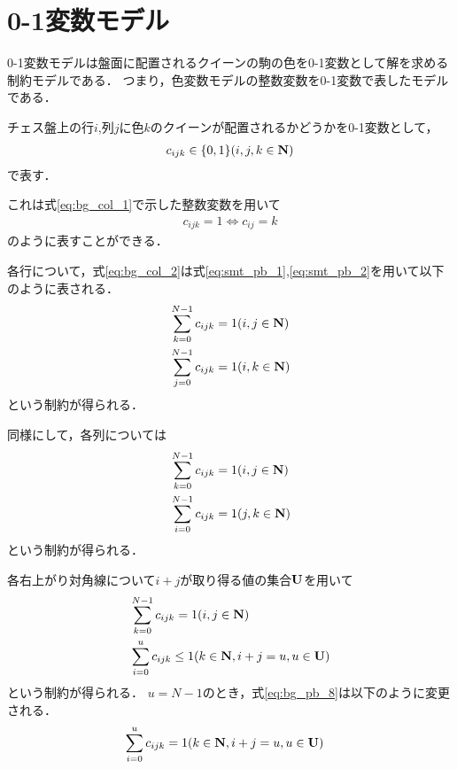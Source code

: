\section{0-1変数モデル}\label{sec:bg_pb}
0-1変数モデルは盤面に配置されるクイーンの駒の色を0-1変数として解を求める制約モデルである．
つまり，色変数モデルの整数変数を0-1変数で表したモデルである．

チェス盤上の行$i$,列$j$に色$k$のクイーンが配置されるかどうかを0-1変数として，
\begin{eqnarray}
    c_{ijk} \in \{0,1\} (i,j,k \in {\bf N}) \label{eq:bg_pb_1}
\end{eqnarray}
で表す．

これは式\ref{eq:bg_col_1}で示した整数変数を用いて
\begin{eqnarray}
    c_{ijk}=1 \Leftrightarrow c_{ij}=k \label{eq:bg_pb_2}
 \end{eqnarray}
のように表すことができる．

各行について，式\ref{eq:bg_col_2}は式\ref{eq:smt_pb_1},\ref{eq:smt_pb_2}を用いて以下のように表される．
\begin{eqnarray}
    & \sum_{k=0}^{N-1} c_{ijk} = 1     (i,j \in {\bf N}) \label{eq:bg_pb_3}\\
    & \sum_{j=0}^{N-1} c_{ijk} = 1     (i,k \in {\bf N}) \label{eq:bg_pb_4}
\end{eqnarray}
という制約が得られる．

同様にして，各列については
\begin{eqnarray}
    & \sum_{k=0}^{N-1} c_{ijk} = 1     (i,j \in {\bf N}) \label{eq:bg_pb_5}\\
    & \sum_{i=0}^{N-1} c_{ijk} = 1     (j,k \in {\bf N}) \label{eq:bg_pb_6}
\end{eqnarray}
という制約が得られる．

各右上がり対角線について$i+j$が取り得る値の集合$\bf U$を用いて
\begin{eqnarray}
    & \sum_{k=0}^{N-1} c_{ijk} = 1     (i,j \in {\bf N})    \label{eq:bg_pb_7}\\
    & \sum_{i=0}^{u} c_{ijk} \leq 1  (k \in {\bf N}, i+j=u, u \in {\bf U}) \label{eq:bg_pb_8}
\end{eqnarray}
という制約が得られる．
$u=N-1$のとき，式\ref{eq:bg_pb_8}は以下のように変更される．
\begin{eqnarray}
    & \sum_{i=0}^{u} c_{ijk} = 1  (k \in {\bf N}, i+j=u, u \in {\bf U}) \label{eq:bg_pb_9}
\end{eqnarray}


